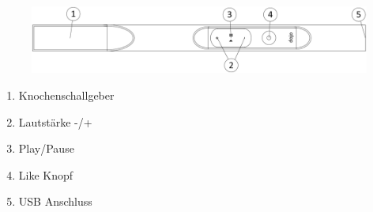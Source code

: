 \begin{figure}[h]
	\centering
	\includegraphics[width=\textwidth]{graphics/DojoUebersicht.png}
\end{figure}
\begin{center}
\parbox{50mm}{
\begin{enumerate}
	\item Knochenschallgeber
    \item Lautstärke -/+
    \item Play/Pause
    \item Like Knopf
    \item USB Anschluss
\end{enumerate}}
\end{center}